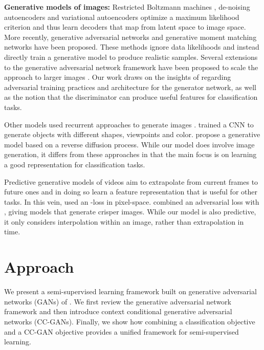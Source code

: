 \documentclass{article} \usepackage{iclr2017_conference,times}
\begin{document}
\textbf{Generative models of images:} Restricted Boltzmann machines \citep{salakhutdinov2015},
de-noising autoencoders \citep{vincent2008} and variational
autoencoders \citep{kingma2014a} optimize a maximum likelihood
criterion and thus learn decoders that map from latent space to image
space.  More recently, generative adversarial networks
\citep{goodfellow2014} and generative moment matching networks
\citep{li2015,karolina2015} have been proposed.  These methods ignore data likelihoods
and instead directly train a generative model to produce realistic
samples.  Several extensions to the generative adversarial network
framework have been proposed to scale the approach to larger images
\citep{denton2015,radford2016,Salimans2016}. Our
work draws on the insights of \cite{radford2016} regarding adversarial training practices
and architecture for the generator network, as well as the notion that
the discriminator can produce useful features for classification
tasks.

Other models used recurrent approaches to generate images
\citep{gregor2015, theis2015, mansimov2016, oord2016}.  \cite{dosovitskiy2015} trained a CNN to generate objects with
different shapes, viewpoints and color.  
\cite{sohldickstein2015} propose a generative model based on a reverse
diffusion process. While our model does involve image generation, it
differs from these approaches in that the main focus is on learning a
good representation for classification tasks.

Predictive generative models of videos aim to extrapolate from current
frames to future ones and in doing so learn a feature
representation that is useful for other tasks. In this vein, \cite{Ranzato14} used an
-loss in pixel-space. \cite{Mathieu15} combined
an adversarial loss with , giving models that generate crisper
images. While our model is also predictive, it only
considers interpolation within an image, rather than extrapolation in
time. 
 

\section{Approach}
We present a semi-supervised learning framework built on generative adversarial networks (GANs) of \cite{goodfellow2014}. 
We first review the generative adversarial network framework and then introduce context conditional generative adversarial networks (CC-GANs).
Finally, we show how combining a classification objective and a CC-GAN objective provides a unified framework for semi-supervised learning.
\end{document}
